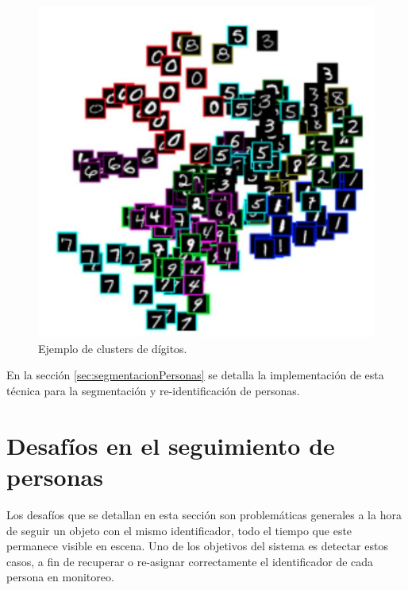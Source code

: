 \begin{figure}[ht]
	\centering
	\includegraphics[scale=0.7]{./Figures/clusterDigitos.jpg}
	\caption{Ejemplo de clusters de dígitos.}
	\label{fig:clusterDigitos}
\end{figure}

En la sección \ref{sec:segmentacionPersonas} se detalla la implementación de esta técnica para la segmentación y re-identificación de personas.

\newpage


\section{Desafíos en el seguimiento de personas}
\label{sec:desafiosSeguimiento}

Los desafíos que se detallan en esta sección son problemáticas generales a la hora de seguir un objeto con el mismo identificador, todo el tiempo que este permanece visible en escena. Uno de los objetivos del sistema es detectar estos casos, a fin de recuperar o re-asignar correctamente el identificador de cada persona en monitoreo. 

